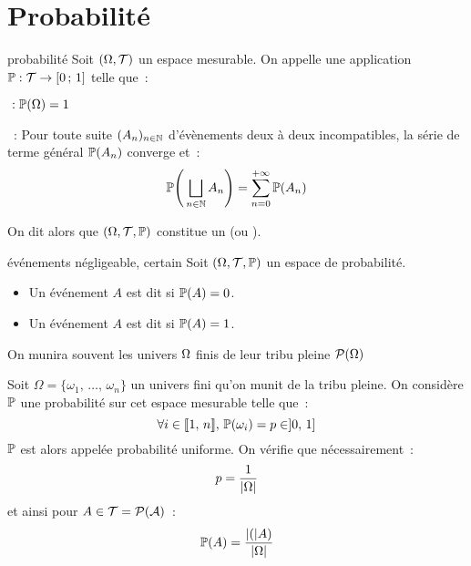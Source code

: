 \section{Probabilité}

\begin{definition}{}{probabilité}
    Soit $(\Omega, \mathcal{T})$ un espace mesurable. On appelle  une application $\mathbb{P} : \mathcal{T} \to [0\, ; \, 1]$ telle que~:
    \begin{enumeratebf}
        \item {}$~: \mathbb{P}(\Omega) = 1$
        \item {}~: Pour toute suite $(A_n)_{n \in \mathbb{N}}$ d'évènements deux à deux incompatibles, la série de terme général $\mathbb{P}(A_n)$ converge et~:
        $$\mathbb{P}\Bigg(\bigsqcup_{n \in \mathbb{N}}A_n\Bigg) = \sum_{n=0}^{+ \infty} \mathbb{P}(A_n)$$
    \end{enumeratebf}
    On dit alors que $(\Omega, \mathcal{T}, \mathbb{P})$ constitue un  (ou ).
\end{definition}

\begin{definition}{}{événements négligeable, certain}
    Soit $(\Omega, \mathcal{T}, \mathbb{P})$ un espace de probabilité.
    \begin{itemize}
        \item Un événement $A$ est dit  si $\mathbb{P}(A) = 0$.
        \item Un événement $A$ est dit  si $\mathbb{P}(A) = 1$.
    \end{itemize}
\end{definition}


\begin{remarque}{}{}
    On munira souvent les univers $\Omega$ finis de leur tribu pleine $\mathcal{P}(\Omega)$
\end{remarque}

\begin{exemple}{}{}
    Soit $\Omega = \{\omega_1,\, \dots,\, \omega_n\}$ un univers fini qu'on munit de la tribu pleine. On considère $\mathbb{P}$ une probabilité sur cet espace mesurable telle que~:
    $$\forall i \in \llbracket 1 ,\, n \rrbracket,\, \mathbb{P}(\omega_i) = p \in ]0,\,1]$$
    $\mathbb{P}$ est alors appelée probabilité uniforme. On vérifie que nécessairement~:
    $$p = \frac{1}{|\Omega|}$$
    et ainsi pour $A \in \mathcal{T} = \mathcal{P(A)}$~:
    $$\mathbb{P}(A) = \frac{|(|A)}{|\Omega|}$$
\end{exemple}

